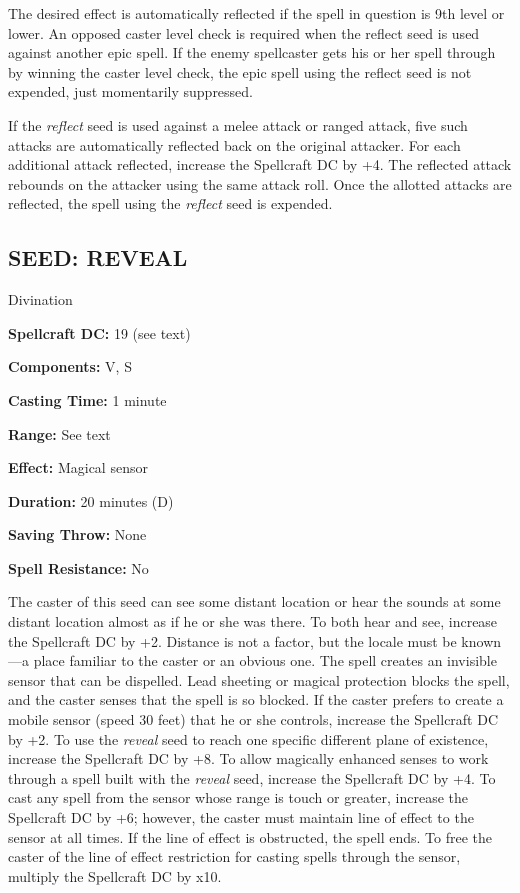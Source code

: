 \documentclass{article}
\begin{document}
The desired effect is automatically reflected if the spell in question is 9th level 
or lower. An opposed caster level check is required when the reflect seed is used 
against another epic spell. If the enemy spellcaster gets his or her spell through 
by winning the caster level check, the epic spell using the reflect seed is not 
expended, just momentarily suppressed.

If the \textit{reflect }seed is used against a melee attack or ranged attack, five 
such attacks are automatically reflected back on the original attacker. For each 
additional attack reflected, increase the Spellcraft DC by +4. The reflected attack 
rebounds on the attacker using the same attack roll. Once the allotted attacks 
are reflected, the spell using the \textit{reflect }seed is expended.

\vspace{12pt}
\subsection*{SEED: REVEAL }

Divination 

\textbf{Spellcraft DC:} 19 (see text) 

\textbf{Components:} V, S 

\textbf{Casting Time:} 1 minute 

\textbf{Range:} See text 

\textbf{Effect:} Magical sensor 

\textbf{Duration:} 20 minutes (D) 

\textbf{Saving Throw:} None 

\textbf{Spell Resistance:} No 

The caster of this seed can see some distant location or hear the sounds at some 
distant location almost as if he or she was there. To both hear and see, increase 
the Spellcraft DC by +2. Distance is not a factor, but the locale must be known---a 
place familiar to the caster or an obvious one. The spell creates an invisible 
sensor that can be dispelled. Lead sheeting or magical protection blocks the spell, 
and the caster senses that the spell is so blocked. If the caster prefers to create 
a mobile sensor (speed 30 feet) that he or she controls, increase the Spellcraft 
DC by +2. To use the \textit{reveal }seed to reach one specific different plane 
of existence, increase the Spellcraft DC by +8. To allow magically enhanced senses 
to work through a spell built with the \textit{reveal }seed, increase the Spellcraft 
DC by +4. To cast any spell from the sensor whose range is touch or greater, increase 
the Spellcraft DC by +6; however, the caster must maintain line of effect to the 
sensor at all times. If the line of effect is obstructed, the spell ends. To free 
the caster of the line of effect restriction for casting spells through the sensor, 
multiply the Spellcraft DC by x10. 
\end{document}
